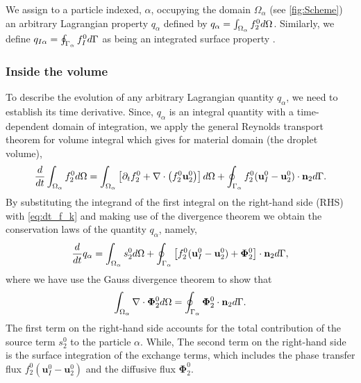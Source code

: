 We assign to a particle indexed, $\alpha$, occupying the domain $\Omega_\alpha$ (see \ref{fig:Scheme}) an arbitrary Lagrangian property $q_\alpha$ defined by $q_\alpha  = \int_{\Omega_\alpha}  f_2^0 d\Omega$.
Similarly, we define $q_{I\alpha} = \oint_{\Gamma_\alpha}  f_I^0 d\Gamma$ as being an integrated surface property .
\subsubsection{Inside the volume }
To describe the evolution of any arbitrary Lagrangian quantity $q_\alpha$, we need to establish its time derivative.
Since, $q_\alpha$ is an integral quantity with a time-dependent domain of integration, we apply the general Reynolds transport theorem for volume integral which gives for material domain (the droplet volume),
\begin{equation}
    \frac{d}{dt}  \int_{\Omega_\alpha} f_2^0 d\Omega
    = \int_{\Omega_\alpha} \left[ \partial_t f_2^0 + \mathbf{\nabla}\cdot\left(f_2^0\textbf{u}_2^0\right) \right] d\Omega\\
    + \oint_{\Gamma_\alpha}  f_2^0 (\textbf{u}_I^0-\textbf{u}_2^0)\cdot \textbf{n}_2  d\Gamma.
    \label{eq:reynolds_transport}
\end{equation}
By substituting the integrand of the first integral on the right-hand side (RHS) with \ref{eq:dt_f_k} and making use of the divergence theorem we obtain the conservation laws of the quantity $q_\alpha$, namely,  
\begin{equation}
    \frac{d}{dt}{q_\alpha}
    = \int_{\Omega_\alpha}  s_2^0  d\Omega
    + \oint_{\Gamma_\alpha}  \left[
        f_2^0 (\textbf{u}_I^0-\textbf{u}_2^0) 
        + \mathbf{\Phi}_2^0 
        \right] \cdot \textbf{n}_2  d\Gamma,
    \label{eq:dt_q_alpha}
\end{equation}
where we have use the Gauss divergence theorem to show that
\begin{equation}
    \int_{\Omega_\alpha} \mathbf{\nabla}\cdot \mathbf{\Phi}_2^0 d\Omega = \oint_{\Gamma_\alpha} \mathbf{\Phi}_2^0 \cdot \textbf{n}_2 d\Gamma.
\end{equation}
The first term on the right-hand side accounts for the total contribution of the source term $s_2^0$ to the particle $\alpha$.
While, The second term on the right-hand side is the surface integration of the exchange terms, which includes the phase transfer flux $f_2^0 (\textbf{u}_I^0-\textbf{u}_2^0)$ and the diffusive flux $\mathbf{\Phi}_2^0$. 


